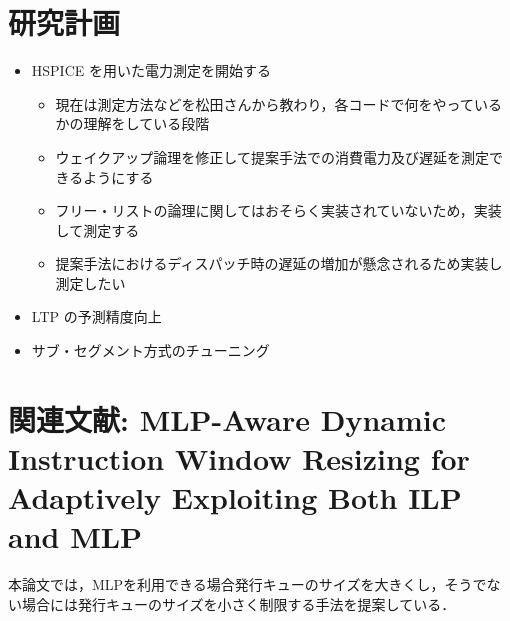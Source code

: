 \documentclass[twocolumn]{jsarticle}
\begin{document}




  \section{研究計画}
  
  \begin{itemize}
    \item HSPICE を用いた電力測定を開始する
    \begin{itemize}
      \item 現在は測定方法などを松田さんから教わり，各コードで何をやっているかの理解をしている段階
      \item ウェイクアップ論理を修正して提案手法での消費電力及び遅延を測定できるようにする
      \item フリー・リストの論理に関してはおそらく実装されていないため，実装して測定する
      \item 提案手法におけるディスパッチ時の遅延の増加が懸念されるため実装し測定したい
    \end{itemize}
    \item LTP の予測精度向上
    \item サブ・セグメント方式のチューニング
  \end{itemize}
  
  \section{関連文献: MLP-Aware Dynamic Instruction Window Resizing
for Adaptively Exploiting Both ILP and MLP~\cite{Kora2013}}
本論文では，MLPを利用できる場合発行キューのサイズを大きくし，そうでない場合には発行キューのサイズを小さく制限する手法を提案している．
\end{document}
